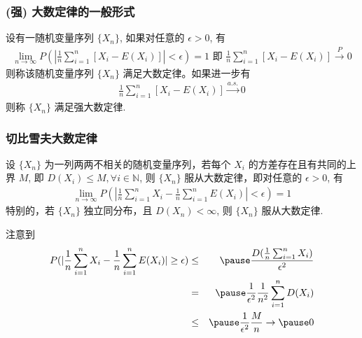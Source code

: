 \documentclass[Prob-All.tex]{subfiles}
\begin{document}
\begin{frame}
	\frametitle{(强) 大数定律的一般形式}
	\begin{defi}
		设有一随机变量序列 $\{X_n\}$, 如果对任意的 $\epsilon>0$, 有
		\begin{eqnarray*}
			\lim_{n\rightarrow\infty} P (|\frac{1}{n}\sum_{i=1}^n [X_i-E (X_i)]|<\epsilon)=1 \mbox{ 即 }  \frac{1}{n}\sum_{i=1}^n [X_i-E (X_i)]\stackrel{P}{\rightarrow} 0
		\end{eqnarray*}
		则称该随机变量序列 $\{X_n\}$ 满足大数定律。如果进一步有
		\begin{eqnarray*}
			\frac{1}{n}\sum_{i=1}^n[X_i-E(X_i)]\stackrel{a.s.}{\rightarrow}0
		\end{eqnarray*}
		则称 $\{X_n\}$ 满足强大数定律.
	\end{defi}
\end{frame}
\begin{frame}
	\frametitle{切比雪夫大数定律}
	\begin{thm}
		设 $\{X_n\}$ 为一列两两不相关的随机变量序列，若每个 $X_i$ 的方差存在且有共同的上界 $M$, 即 $D (X_i)\le M, \forall i\in \mathbb{N}$, 则 $\{X_n\}$ 服从大数定律，即对任意的 $\epsilon>0$, 有
		\begin{eqnarray*}
			\lim_{n\rightarrow\infty}P(|\frac{1}{n}\sum_{i=1}^nX_i-\frac{1}{n}\sum_{i=1}^nE(X_i)|<\epsilon)=1
		\end{eqnarray*}
		特别的，若 $\{X_n\}$ 独立同分布，且 $D (X_n)<\infty$, 则 $\{X_n\}$ 服从大数定律.
	\end{thm}

	\pause \zheng 注意到
	\begin{eqnarray*}
		P(|\frac{1}{n}\sum_{i=1}^nX_i-\frac{1}{n}\sum_{i=1}^nE(X_i)|\ge\epsilon)&\le&\pause  \dfrac{D(\frac{1}{n}\sum_{i=1}^nX_i)}{\epsilon^2}\\
		&=&\pause \dfrac{1}{\epsilon^2}\dfrac{1}{n^2}\sum_{i=1}^nD(X_i)\\
		&\le&\pause \dfrac{1}{\epsilon^2}\dfrac{M}{n}\rightarrow\pause 0
	\end{eqnarray*}

\end{frame}
\end{document}
